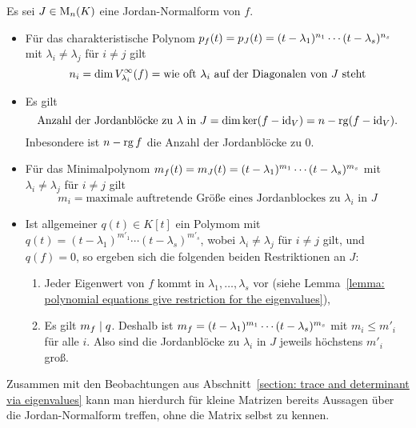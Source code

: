 Es sei $J \in \matrices{n}{K}$ eine Jordan-Normalform von $f$.
\begin{itemize}
  \item
    Für das charakteristische Polynom $\charpol{f}(t) = \charpol{J}(t) = (t - \lambda_1)^{n_1} \dotsm (t - \lambda_s)^{n_s}$ mit $\lambda_i \neq \lambda_j$ für $i \neq j$ gilt
    \[
        n_i
      = \dim \geigenspace{V}{f}{\lambda_i}
      = \text{wie oft $\lambda_i$ auf der Diagonalen von $J$ steht}
    \]
  \item
    Es gilt
    \[
        \text{Anzahl der Jordanblöcke zu $\lambda$ in $J$}
      = \dim \ker (f - \id_V)
      = n - \rank (f - \id_V).
    \]
    Inbesondere ist $n - \rank f$ die Anzahl der Jordanblöcke zu $0$.
  \item
    Für das Minimalpolynom $\minpol{f}(t) = \minpol{J}(t) = (t - \lambda_1)^{m_1} \dotsm (t - \lambda_s)^{m_s}$ mit $\lambda_i \neq \lambda_j$ für $i \neq j$ gilt
    \[
        m_i
      = \text{maximale auftretende Größe eines Jordanblockes zu $\lambda_i$ in $J$}
    \]
  \item
    Ist allgemeiner $q(t) \in K[t]$ ein Polymom mit $q(t) = (t - \lambda_1)^{m'_1} \dotsm (t - \lambda_s)^{m'_s}$, wobei $\lambda_i \neq \lambda_j$ für $i \neq j$ gilt, und $q(f) = 0$, so ergeben sich die folgenden beiden Restriktionen an $J$:
    \begin{enumerate}
      \item
        Jeder Eigenwert von $f$ kommt in $\lambda_1, \dotsc, \lambda_s$ vor (siehe Lemma~\ref{lemma: polynomial equations give restriction for the eigenvalues}),
      \item
        Es gilt $\minpol{f} \divides q$.
        Deshalb ist $\minpol{f} = (t - \lambda_1)^{m_1} \dotsm (t - \lambda_s)^{m_s}$ mit $m_i \leq m'_i$ für alle $i$.
        Also sind die Jordanblöcke zu $\lambda_i$ in $J$ jeweils höchstens $m'_i$ groß.
    \end{enumerate}
\end{itemize}

Zusammen mit den Beobachtungen aus Abschnitt~\ref{section: trace and determinant via eigenvalues} kann man hierdurch für kleine Matrizen bereits Aussagen über die Jordan-Nor\-mal\-form treffen, ohne die Matrix selbst zu kennen.

